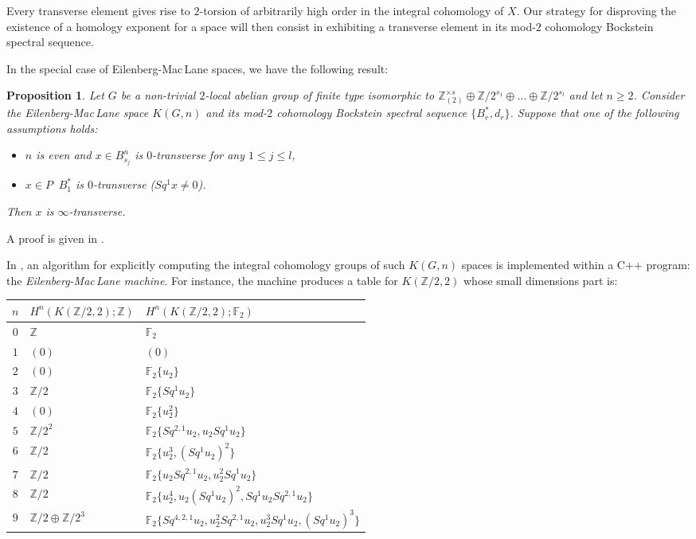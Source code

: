 \documentclass{amsart}
\newtheorem{prop}[thm]{Proposition}
\theoremstyle{definition}
\theoremstyle{remark}
\DeclareMathOperator{\even}{^{even}}
\newcommand{\Z}{\mathbb{Z}}
\newcommand{\F}{\mathbb{F}}
\renewcommand{\geq}{\geqslant}
\renewcommand{\leq}{\leqslant}
\begin{document}
Every transverse element gives rise to $2$-torsion of arbitrarily high order in the integral cohomology of $X$. Our strategy for disproving the existence of a homology exponent for a space will then consist in exhibiting a transverse element in its mod-$2$ cohomology Bockstein spectral sequence. 

In the special case of Eilenberg-Mac\,Lane spaces, we have the following result:

\begin{prop}\label{p:transversity}
Let $G$ be a non-trivial $2$-local abelian group of finite type isomorphic to $\Z_{(2)}^{\times s}\oplus\Z/2^{s_1}\oplus\dots\oplus\Z/2^{s_l}$ and let $n\geq2$. Consider the Eilenberg-Mac\,Lane space $K(G,n)$ and its mod-$2$ cohomology Bockstein spectral sequence $\{B^*_r,d_r\}$. Suppose that one of the following assumptions holds:
\begin{itemize}
\item[$\bullet$]{$n$ is even and $x\in B^n_{s_j}$ is $0$-transverse for any $1\leq j\leq l$,}
\item[$\bullet$]{$x\in P\even B_1^*$ is $0$-transverse ($Sq^1x\not=0$).}
\end{itemize}
Then $x$ is $\infty$-transverse.
\end{prop}

A proof is given in \cite[Theorem 1.3.2]{Cl02-PhD}.

In \cite{Cl02-EMM}, an algorithm for explicitly computing the integral cohomology groups of such $K(G,n)$ spaces is implemented within a C++ program: the {\it Eilenberg-Mac\,Lane machine}. For instance, the machine produces a table for $K(\Z/2,2)$ whose small dimensions part is: 

\medskip
\begin{tabular}{|c|p{3cm}|p{8cm}|}
\hline
$n$ &$H^n(K(\Z/2,2);\Z)$ &$H^n(K(\Z/2,2);\F_2)$ \\
\hline

$0$%
&$\Z$
&$\F_2$\\

$1$%
&$(0)$%
&$(0)$\\

$2$%
&$(0)$%
&$\F_2\{u_2\}$\\

$3$%
&$\Z/2$%
&$\F_2\{Sq^1u_2\}$\\

$4$%
&$(0)$%
&$\F_2\{u_2^2\}$\\

$5$%
&$\Z/2^{2}$%
&$\F_2\{Sq^{2,1}u_2,u_2Sq^1u_2\}$\\

$6$%
&$\Z/2$%
&$\F_2\{u_2^3,(Sq^1u_2)^2\}$\\

$7$%
&$\Z/2$%
&$\F_2\{u_2Sq^{2,1}u_2,u_2^2Sq^1u_2\}$\\

$8$%
&$\Z/2$%
&$\F_2\{u_2^4,u_2(Sq^1u_2)^2,Sq^1u_2Sq^{2,1}u_2\}$\\

$9$%
&$\Z/2\oplus\Z/2^{3}$%
&$\F_2\{Sq^{4,2,1}u_2,u_2^2Sq^{2,1}u_2,u_2^3Sq^1u_2,(Sq^1u_2)^3\}$\\

\hline
\end{tabular}
\medskip
\end{document}
